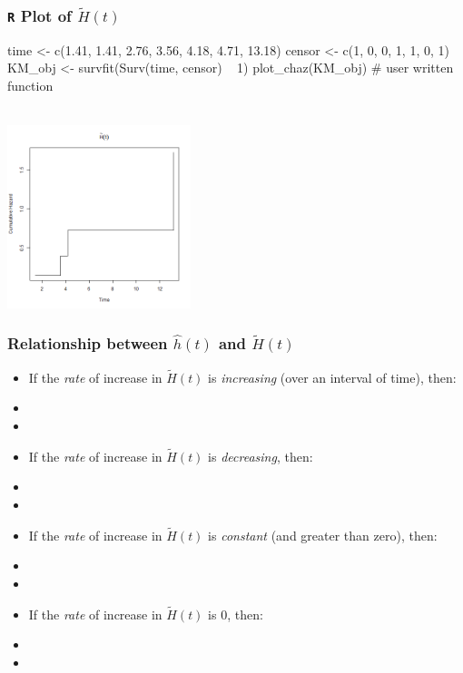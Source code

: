 \begin{frame}[fragile]
\frametitle{\texttt{R} Plot of  $\tilde{H}(t)$}
\begin{RcodeTiny}{.0}
time <- c(1.41, 1.41, 2.76, 3.56, 4.18, 4.71, 13.18)
censor <- c(1, 0, 0, 1, 1, 0, 1)
KM_obj <- survfit(Surv(time, censor) ~ 1)
plot_chaz(KM_obj)  # user written function
\end{RcodeTiny}\\
\includegraphics[width=0.40\textwidth]{Figures/KM_chaz.png}
\end{frame}

\begin{frame}
\frametitle{Relationship between $\hat{h}(t)$ and $\tilde{H}(t)$}
\begin{itemize}
\item If the \textit{rate} of increase in $\tilde{H}(t)$ is \textit{increasing} (over an interval of time), then:
\item[]
\item[]
\item If the \textit{rate} of increase in $\tilde{H}(t)$ is \textit{decreasing}, then:
\item[]
\item[]
\item If the \textit{rate} of increase in $\tilde{H}(t)$ is \textit{constant} (and greater than zero), then:
\item[]
\item[]
\item If the \textit{rate} of increase in $\tilde{H}(t)$ is 0, then:
\item[]
\item[]
\end{itemize}
\end{frame}

